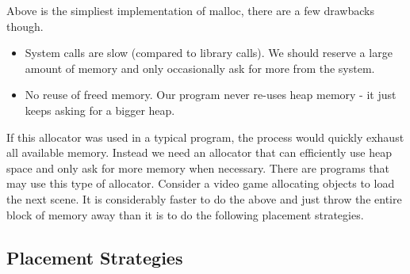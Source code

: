 Above is the simpliest implementation of malloc, there are a few drawbacks though.

\begin{itemize}
\item System calls are slow (compared to library calls). We should reserve a large amount of memory and only occasionally ask for more from the system. 
\item No reuse of freed memory. Our program never re-uses heap memory - it just keeps asking for a bigger heap.
\end{itemize}

If this allocator was used in a typical program, the process would quickly exhaust all available memory.
Instead we need an allocator that can efficiently use heap space and only ask for more memory when necessary.
There are programs that may use this type of allocator.
Consider a video game allocating objects to load the next scene.
It is considerably faster to do the above and just throw the entire block of memory away than it is to do the following placement strategies.

\subsection{Placement Strategies}

